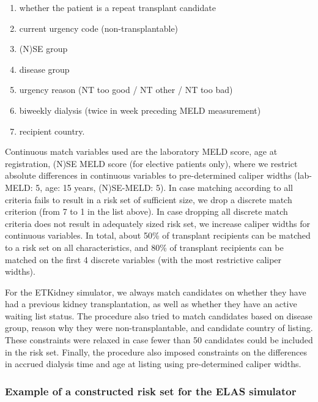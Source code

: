 \documentclass[11pt,twoside,]{book}
\providecommand{\tightlist}{%
  \setlength{\itemsep}{0pt}\setlength{\parskip}{0pt}}
\begin{document}
\begin{enumerate}
\def\labelenumi{\arabic{enumi}.}
\tightlist
\item
  whether the patient is a repeat transplant candidate
\item
  current urgency code (non-transplantable)
\item
  (N)SE group
\item
  disease group
\item
  urgency reason (NT too good / NT other / NT too bad)
\item
  biweekly dialysis (twice in week preceding MELD measurement)
\item
  recipient country.
\end{enumerate}

Continuous match variables used are the laboratory MELD score, age at
registration, (N)SE MELD score (for elective patients only), where we
restrict absolute differences in continuous variables to pre-determined
caliper widths (lab-MELD: 5, age: 15 years, (N)SE-MELD: 5). In case
matching according to all criteria fails to result in a risk set of
sufficient size, we drop a discrete match criterion (from 7 to 1 in the
list above). In case dropping all discrete match criteria does not
result in adequately sized risk set, we increase caliper widths for
continuous variables. In total, about 50\% of transplant recipients can
be matched to a risk set on all characteristics, and 80\% of
transplant recipients can be matched on
the first 4 discrete variables (with the most restrictive caliper
widths).

For the ETKidney simulator, we always match candidates on whether they have
had a previous kidney transplantation, as well as whether they have an active
waiting list status. The procedure also tried to match candidates based on disease group, reason why they were non-transplantable, and candidate country of listing. These constraints were relaxed in case fewer than 50 candidates could be
included in the risk set. Finally, the procedure also imposed constraints on the
differences in accrued dialysis time and age at listing using pre-determined
caliper widths.

\subsubsection*{Example of a constructed risk set for the ELAS simulator}\label{example-of-a-constructed-risk-set-for-the-elas-simulator}
\end{document}

